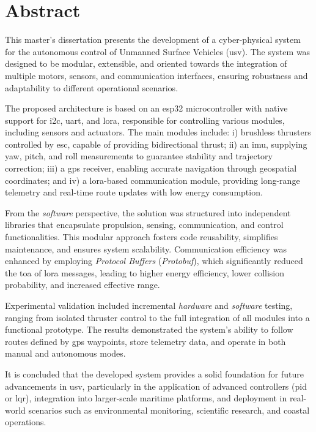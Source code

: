 \chapter*{Abstract}

This master's dissertation presents the development of a cyber-physical system for the autonomous control of Unmanned Surface Vehicles (\acrfull{usv}). The system was designed to be modular, extensible, and oriented towards the integration of multiple motors, sensors, and communication interfaces, ensuring robustness and adaptability to different operational scenarios.  

The proposed architecture is based on an \gls{esp32} microcontroller with native support for \gls{i2c}, \gls{uart}, and \gls{lora}, responsible for controlling various modules, including sensors and actuators. The main modules include: i) brushless thrusters controlled by \acrfull{esc}, capable of providing bidirectional thrust; ii) an \acrfull{imu}, supplying yaw, pitch, and roll measurements to guarantee stability and trajectory correction; iii) a \acrfull{gps} receiver, enabling accurate navigation through geospatial coordinates; and iv) a \gls{lora}-based communication module, providing long-range telemetry and real-time route updates with low energy consumption.  

From the \emph{software} perspective, the solution was structured into independent libraries that encapsulate propulsion, sensing, communication, and control functionalities. This modular approach fosters code reusability, simplifies maintenance, and ensures system scalability. Communication efficiency was enhanced by employing \emph{Protocol Buffers} (\emph{Protobuf}), which significantly reduced the \gls{toa} of \gls{lora} messages, leading to higher energy efficiency, lower collision probability, and increased effective range.  

Experimental validation included incremental \emph{hardware} and \emph{software} testing, ranging from isolated thruster control to the full integration of all modules into a functional prototype. The results demonstrated the system's ability to follow routes defined by \acrfull{gps} waypoints, store telemetry data, and operate in both manual and autonomous modes.  

It is concluded that the developed system provides a solid foundation for future advancements in \gls{usv}, particularly in the application of advanced controllers (\acrfull{pid} or \acrfull{lqr}), integration into larger-scale maritime platforms, and deployment in real-world scenarios such as environmental monitoring, scientific research, and coastal operations.

